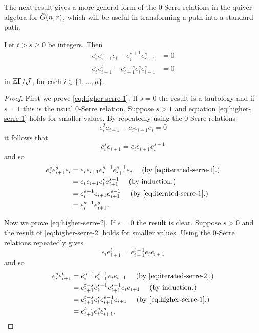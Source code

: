 \documentclass[a4paper, 11pt]{report}
\begin{document}
The next result gives a more general form of the $0$-Serre relations in the quiver algebra for $\hat{G}(n,r)$, which will be useful in transforming a path into a standard path.

\begin{lemma}\label{lemma:higher-Serre-relations-plus}
Let $t>s\geq 0$ be integers. Then
\begin{align}
e_i^s e_{i+1}^s e_i - e_i^{s+1}e_{i+1}^s &= 0 \label{eq:higher-serre-1}\\
e_i^s e_{i+1}^t - e_{i+1}^{t-s} e_i^s e_{i+1}^s &= 0 \label{eq:higher-serre-2}
\end{align}
in $\mathbb{Z}\Gamma/{\mathcal{J}}$, for each $i\in\{1,\ldots,n\}$.
\end{lemma}

\begin{proof}
First we prove \ref{eq:higher-serre-1}. If $s=0$ the result is a tautology and if $s=1$ this is the usual $0$-Serre relation. Suppose $s>1$ and equation \ref{eq:higher-serre-1} holds for smaller values. By repeatedly using the $0$-Serre relations
\begin{equation*}
e_i^2e_{i+1} - e_ie_{i+1}e_i = 0
\end{equation*}
it follows that
\begin{equation}
e_i^se_{i+1} = e_i e_{i+1} e_i^{s-1} \label{eq:iterated-serre-1}
\end{equation}
and so
\begin{align*}
e_i^se_{i+1}^se_i
&= e_ie_{i+1}e_i^{s-1}e_{i+1}^{s-1}e_i \quad\text{ (by \ref{eq:iterated-serre-1}.)}\\
&= e_ie_{i+1}e_i^s e_{i+1}^{s-1} \quad\text{ (by induction.)}\\
&= e_i^{s+1}e_{i+1}e_{i+1}^{s-1} \quad\text{ (by \ref{eq:iterated-serre-1}.})\\
&= e_i^{s+1}e_{i+1}^s.
\end{align*}

Now we prove \ref{eq:higher-serre-2}. If $s=0$ the result is clear. Suppose $s>0$ and the result of \ref{eq:higher-serre-2} holds for smaller values. Using the $0$-Serre relations repeatedly gives
\begin{equation}
e_ie_{i+1}^t = e_{i+1}^{t-1}e_ie_{i+1} \label{eq:iterated-serre-2}
\end{equation}
and so
\begin{align*}
e_i^se_{i+1}^t
&= e_i^{s-1}e_{i+1}^{t-1}e_ie_{i+1} \quad\text{ (by \ref{eq:iterated-serre-2}.)}\\
&= e_{i+1}^{t-s}e_i^{s-1}e_{i+1}^{s-1}e_ie_{i+1} \quad\text{ (by induction.)}\\
&= e_{i+1}^{t-s}e_i^se_{i+1}^{s-1}e_{i+1} \quad\text{ (by \ref{eq:higher-serre-1}.)}\\
&= e_{i+1}^{t-s} e_i^se_{i+1}^s.
\end{align*}
\end{proof}
\end{document}
